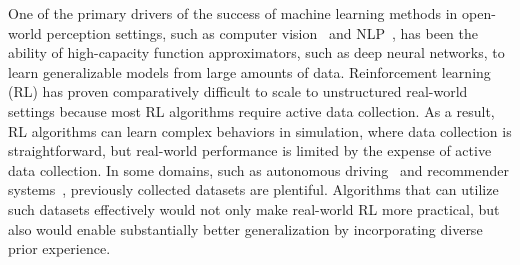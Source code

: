 One of the primary drivers
of the success of machine learning methods in open-world perception settings, such as computer vision~\cite{he2016resnet} and NLP~\cite{devlin2018bert}, has been the ability of high-capacity function approximators, such as deep neural networks, to learn generalizable models from large amounts of data. Reinforcement learning (RL) has proven comparatively difficult to scale to unstructured real-world settings because most RL algorithms require active data collection. As a result, RL algorithms can learn complex behaviors in simulation, where data collection is straightforward, 
but real-world performance is limited by the expense of active data collection. 
In some domains, such as autonomous driving~\cite{yu2018bdd} and recommender systems~\citep{bennett2007netflix}, previously collected datasets are plentiful. Algorithms that can utilize such datasets effectively would not only make real-world RL more practical, but also would enable substantially better generalization by incorporating diverse prior experience.  

